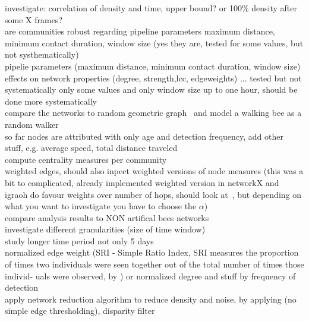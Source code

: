 investigate: correlation of density and time, upper bound? or 100\% density after some X frames?\\
are communities robust regarding pipeline parameters maximum distance, minimum contact duration, window size (yes they are, tested for some values, but not systhematically)\\
pipelie parameters (maximum distance, minimum contact duration, window size) effects on network properties (degree, strength,lcc, edgeweights) ... tested but not systematically only some values and only window size up to one hour, should be done more systematically\\
compare the networks to random geometric graph~\cite{rgg2002} and model a walking bee as a random walker\\
so far nodes are attributed with only age and detection frequency, add other stuff, e.g. average speed, total distance traveled\\
compute centrality measures per community\\
weighted edges, should also inpect weighted versions of node measures (this was a bit to complicated, already implemented weighted version in networkX and igraoh do favour weights over number of hops, should look at~\textcite{opsahl2010node}, but depending on what you want to investigate you have to choose the $\alpha$)\\
compare analysis results to NON artifical bees networks\\
investigate different granularities (size of time window)\\
study longer time period not only 5 days\\
normalized edge weight (SRI - Simple Ratio Index, SRI measures
the proportion of times two individuals were seen
together out of the total number of times those individ-
uals were observed, by \textcite{croft2008exploring}) or normalized degree and stuff by frequency of detection\\
apply network reduction algorithm to reduce density and noise, by applying (no simple edge thresholding), disparity filter~\textcite{serrano2009extracting}
